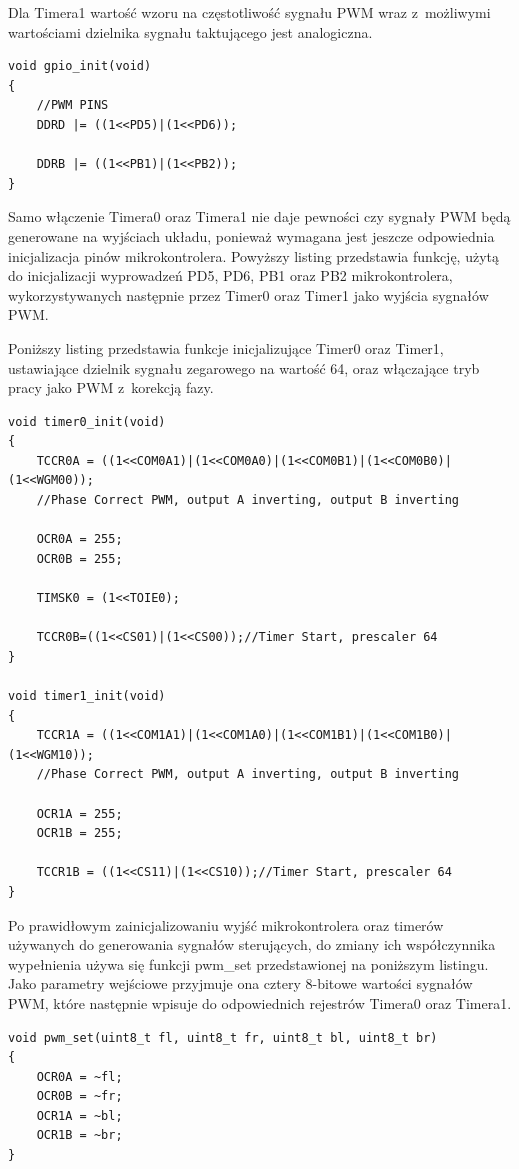 Dla Timera1 wartość wzoru na częstotliwość sygnału PWM wraz z~możliwymi wartościami dzielnika sygnału taktującego jest analogiczna.

\begin{lstlisting}
void gpio_init(void)
{
	//PWM PINS
	DDRD |= ((1<<PD5)|(1<<PD6));

	DDRB |= ((1<<PB1)|(1<<PB2));
}
\end{lstlisting}

Samo włączenie Timera0 oraz Timera1 nie daje pewności czy sygnały PWM będą generowane na wyjściach układu, ponieważ wymagana jest jeszcze odpowiednia inicjalizacja pinów mikrokontrolera. Powyższy listing przedstawia funkcję, użytą do inicjalizacji wyprowadzeń PD5, PD6, PB1 oraz PB2 mikrokontrolera, wykorzystywanych następnie przez Timer0 oraz Timer1 jako wyjścia sygnałów PWM. 


Poniższy listing przedstawia funkcje inicjalizujące Timer0 oraz Timer1, ustawiające dzielnik sygnału zegarowego na wartość 64, oraz włączające tryb pracy jako PWM z~korekcją fazy.

\begin{lstlisting}
void timer0_init(void)
{
	TCCR0A = ((1<<COM0A1)|(1<<COM0A0)|(1<<COM0B1)|(1<<COM0B0)|(1<<WGM00));
	//Phase Correct PWM, output A inverting, output B inverting

	OCR0A = 255;
	OCR0B = 255;

	TIMSK0 = (1<<TOIE0);

	TCCR0B=((1<<CS01)|(1<<CS00));//Timer Start, prescaler 64
}

void timer1_init(void)
{
	TCCR1A = ((1<<COM1A1)|(1<<COM1A0)|(1<<COM1B1)|(1<<COM1B0)|(1<<WGM10));
	//Phase Correct PWM, output A inverting, output B inverting

	OCR1A = 255;
	OCR1B = 255;

	TCCR1B = ((1<<CS11)|(1<<CS10));//Timer Start, prescaler 64
}
\end{lstlisting}




Po prawidłowym zainicjalizowaniu wyjść mikrokontrolera oraz timerów używanych do generowania sygnałów sterujących, do zmiany ich współczynnika wypełnienia używa się funkcji pwm\_set przedstawionej na poniższym listingu. Jako parametry wejściowe przyjmuje ona cztery 8-bitowe wartości sygnałów PWM, które następnie wpisuje do odpowiednich rejestrów Timera0 oraz Timera1.

\begin{lstlisting}
void pwm_set(uint8_t fl, uint8_t fr, uint8_t bl, uint8_t br)
{
	OCR0A = ~fl;
	OCR0B = ~fr;
	OCR1A = ~bl;
	OCR1B = ~br;
}
\end{lstlisting}



